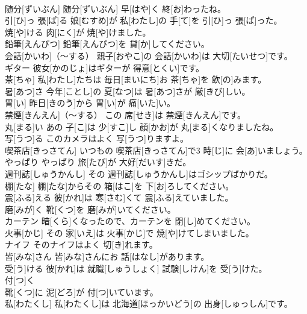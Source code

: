 \documentclass[8pt]{extreport}
\begin{document}
\begin{CJK}{UTF8}{min}
\\	随分[ずいぶん]	随分[ずいぶん] 早[はや]く 終[お]わったね。		
\\	引[ひ]っ 張[ぱ]る	娘[むすめ]が 私[わたし]の 手[て]を 引[ひ]っ 張[ぱ]った。		
\\	焼[や]ける	肉[にく]が 焼[や]けました。		
\\	鉛筆[えんぴつ]	鉛筆[えんぴつ]を 貸[か]してください。		
\\	会話[かいわ]（～する）	親子[おやこ]の 会話[かいわ]は 大切[たいせつ]です。		
\\	ギター	彼女[かのじょ]はギターが 得意[とくい]です。		
\\	茶[ちゃ]	私[わたし]たちは 毎日[まいにち]お 茶[ちゃ]を 飲[の]みます。		
\\	暑[あつ]さ	今年[ことし]の 夏[なつ]は 暑[あつ]さが 厳[きび]しい。		
\\	胃[い]	昨日[きのう]から 胃[い]が 痛[いた]い。		
\\	禁煙[きんえん]（～する）	この 席[せき]は 禁煙[きんえん]です。		
\\	丸[まる]い	あの 子[こ]は 少[すこ]し 顔[かお]が 丸[まる]くなりましたね。		
\\	写[うつ]る	このカメラはよく 写[うつ]りますよ。		
\\	喫茶店[きっさてん]	いつもの 喫茶店[きっさてん]で3 時[じ]に 会[あ]いましょう。		
\\	やっぱり	やっぱり 旅[たび]が 大好[だいす]きだ。		
\\	週刊誌[しゅうかんし]	その 週刊誌[しゅうかんし]はゴシップばかりだ。		
\\	棚[たな]	棚[たな]からその 箱[はこ]を 下[お]ろしてください。		
\\	震[ふる]える	彼[かれ]は 寒[さむ]くて 震[ふる]えていました。		
\\	磨[みが]く	靴[くつ]を 磨[みが]いてください。		
\\	カーテン	暗[くら]くなったので、カーテンを 閉[し]めてください。		
\\	火事[かじ]	その 家[いえ]は 火事[かじ]で 焼[や]けてしまいました。		
\\	ナイフ	そのナイフはよく 切[き]れます。		
\\	皆[みな]さん	皆[みな]さんにお 話[はなし]があります。		
\\	受[う]ける	彼[かれ]は 就職[しゅうしょく] 試験[しけん]を 受[う]けた。		
\\	付[つ]く
\\	靴[くつ]に 泥[どろ]が 付[つ]いています。		
\\	私[わたくし]	私[わたくし]は 北海道[ほっかいどう]の 出身[しゅっしん]です。		

\end{CJK}
\end{document}
